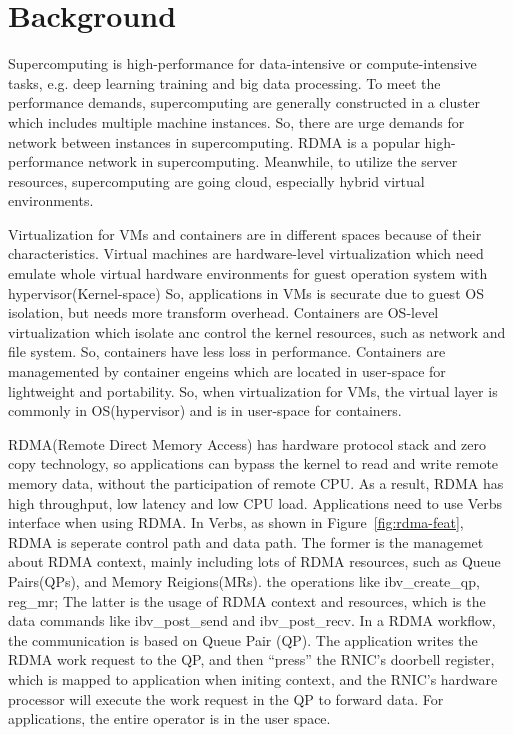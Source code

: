 \section{Background}

Supercomputing is high-performance for data-intensive or compute-intensive tasks, e.g. deep learning training and big data processing. To meet the performance demands, supercomputing are generally constructed in a cluster which includes multiple machine instances. So, there are urge demands for network between instances in supercomputing. RDMA is a popular high-performance network in supercomputing. Meanwhile, to utilize the server resources, supercomputing are going cloud, especially hybrid virtual environments.

Virtualization for VMs and containers are in different spaces because of their characteristics. Virtual machines are hardware-level virtualization which need emulate whole virtual hardware environments for guest operation system with hypervisor(Kernel-space) So, applications in VMs is securate due to guest OS isolation, but needs more transform overhead. Containers are OS-level virtualization which isolate anc control the kernel resources, such as network and file system. So, containers have less loss in performance. Containers are managemented by container engeins which are located in user-space for lightweight and portability. So, when virtualization for VMs, the virtual layer is commonly in OS(hypervisor) and is in user-space for containers.

RDMA(Remote Direct Memory Access) has hardware protocol stack and zero copy technology, so applications can bypass the kernel to read and write remote memory data, without the participation of remote CPU. As a result, RDMA has high throughput, low latency and low CPU load. Applications need to use Verbs interface when using RDMA. In Verbs, as shown in Figure~\ref{fig:rdma-feat}, RDMA is seperate control path and data path. The former is the managemet about RDMA context, mainly including lots of RDMA resources, such as Queue Pairs(QPs), and Memory Reigions(MRs). the operations like ibv\_create\_qp, reg\_mr; The latter is the usage of RDMA context and resources,  which is the data commands like ibv\_post\_send and ibv\_post\_recv. In a RDMA workflow, the communication is based on Queue Pair (QP). The application writes the RDMA work request to the QP, and then ``press''  the RNIC's doorbell register, which is mapped to application when initing context, and the RNIC's hardware processor will execute the work request in the QP to forward data. For applications, the entire operator is in the user space.

